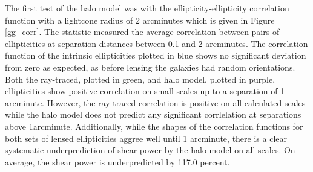 \documentclass[%
 reprint,
 amsmath,amssymb,
 aps,nofootinbib
]{revtex4-1}
\begin{document}
The first test of the halo model was with the ellipticity-ellipticity correlation function with a lightcone radius of 2 arcminutes which is given in Figure \ref{gg_corr}. The statistic measured the average correlation between pairs of ellipticities at separation distances between 0.1 and 2 arcminutes. The correlation function of the intrinsic ellipticities plotted in blue shows no significant deviation from zero as expected, as before lensing the galaxies had random orientations. Both the ray-traced, plotted in green, and halo model, plotted in purple, ellipticities show positive correlation on small scales up to a separation of 1 arcminute. However, the ray-traced correlation is positive on all calculated scales while the halo model does not predict any significant corrlelation at separations above 1arcminute. Additionally, while the shapes of the correlation functions for both sets of lensed ellipticities aggree well until 1 arcminute, there is a clear systematic underprediction of shear power by the halo model on all scales. On average, the shear power is underpredicted by 117.0 percent.
\end{document}
